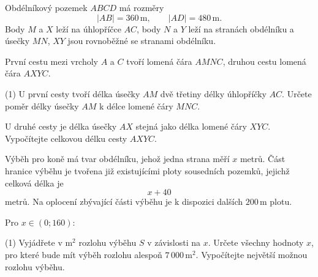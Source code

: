 \documentclass[12pt,a4paper]{article}
\begin{document}
\begin{exercise}

    Obdélníkový pozemek $ABCD$ má rozměry
    \[
        |AB|=360\,\mathrm{m},
        \qquad
        |AD|=480\,\mathrm{m}.
    \]
    Body $M$ a $X$ leží na úhlopříčce $AC$, body $N$ a $Y$ leží
    na stranách obdélníku a úsečky $MN$, $XY$ jsou rovnoběžné
    se stranami obdélníku.

    První cestu mezi vrcholy $A$ a $C$ tvoří lomená čára $AMNC$,
    druhou cestu lomená čára $AXYC$.

    \begin{tasks}(1)
        \task
        U první cesty tvoří délka úsečky $AM$ dvě třetiny délky úhlopříčky $AC$.
        Určete poměr délky úsečky $AM$ k délce lomené čáry $MNC$.

        \task
        U druhé cesty je délka úsečky $AX$ stejná jako délka lomené čáry $XYC$.
        Vypočítejte celkovou délku cesty $AXYC$.
    \end{tasks}

\end{exercise}



\begin{exercise}

    Výběh pro koně má tvar obdélníku, jehož jedna strana měří $x$ metrů.
    Část hranice výběhu je tvořena již existujícími ploty sousedních pozemků,
    jejichž celková délka je
    \[
        x+40
    \]
    metrů. Na oplocení zbývající části výběhu je k dispozici dalších
    $200\,\mathrm{m}$ plotu.

    \begin{center}
    \end{center}

    Pro $x\in(0;160)$:

    \begin{tasks}(1)
        \task Vyjádřete v $\mathrm{m}^2$ rozlohu výběhu $S$ v závislosti na $x$.
        \task Určete všechny hodnoty $x$, pro které bude mít výběh rozlohu alespoň
        $7\,000\,\mathrm{m}^2$.
        \task Vypočítejte největší možnou rozlohu výběhu.
    \end{tasks}

\end{exercise}
\end{document}
